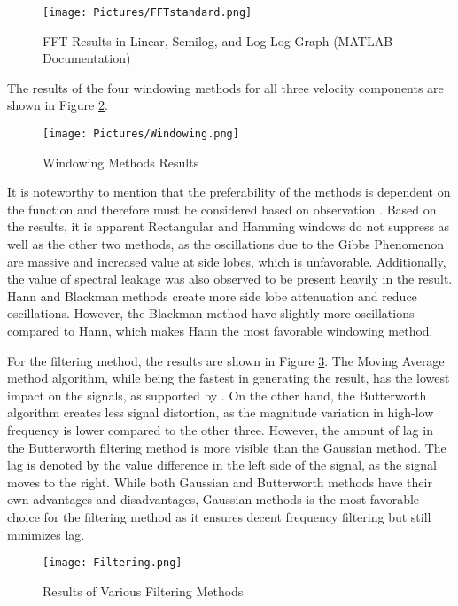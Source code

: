\documentclass[11pt]{article}
\begin{document}
\begin{figure}[ht]
    \centering
    \texttt{[image: Pictures/FFTstandard.png]}
    \caption{FFT Results in Linear, Semilog, and Log-Log Graph (MATLAB Documentation)}
    \label{fig:FFTStd}
\end{figure}
\noindent The results of the four windowing methods for all three velocity components are shown in Figure \ref{fig:wmethods}. 

\begin{figure}[ht]
    \centering
    \texttt{[image: Pictures/Windowing.png]}
    \caption{Windowing Methods Results}
    \label{fig:wmethods}
\end{figure}
\newpage
\noindent It is noteworthy to mention that the preferability of the methods is dependent on the function and  therefore must be considered based on observation \citep{NI2023}. Based on the results, it is apparent Rectangular and Hamming windows do not suppress as well as the other two methods, as the oscillations due to the Gibbs Phenomenon are massive and increased value at side lobes, which is unfavorable. Additionally, the value of spectral leakage was also observed to be present heavily in the result. Hann and Blackman methods create more side lobe attenuation and reduce oscillations. However, the Blackman method have slightly more oscillations compared to Hann, which makes Hann the most favorable windowing method. \par
\medskip
\noindent For the filtering method, the results are shown in Figure \ref{fig:filt}. The Moving Average method algorithm, while being the fastest in generating the result, has the lowest impact on the signals, as supported by \citet{Smith1998}. On the other hand, the Butterworth algorithm creates less signal distortion, as the magnitude variation in high-low frequency is lower compared to the other three. However, the amount of lag in the Butterworth filtering method is more visible than the Gaussian method. The lag is denoted by the value difference in the left side of the signal, as the signal moves to the right. While both Gaussian and Butterworth methods have their own advantages and disadvantages, Gaussian methods is the most favorable choice for the filtering method as it ensures decent frequency filtering but still minimizes lag.
\newpage
\begin{figure}[ht]
    \centering
    \texttt{[image: Filtering.png]}
    \caption{Results of Various Filtering Methods}
    \label{fig:filt}
\end{figure}
\end{document}
